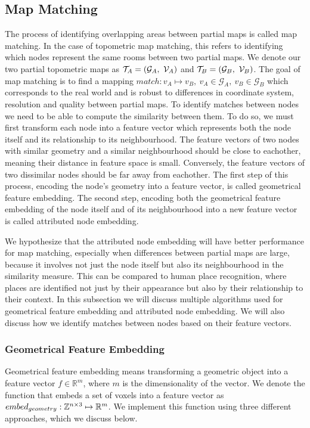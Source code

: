 \subsection{Map Matching}
The process of identifying overlapping areas between partial maps is called map matching. In the case of topometric map matching, this refers to identifying which nodes represent the same rooms between two partial maps. We denote our two partial topometric maps as \(\topometricmap_A = (\mathcal{G}_A,\ \voxelgrid_A)\) and \(\mathcal{T}_B = (\mathcal{G}_B,\ \mathcal{V}_B)\). The goal of map matching is to find a mapping \(match: v_A \mapsto v_B,\ v_A \in \mathcal{G}_A,\ v_B \in \mathcal{G}_B\) which corresponds to the real world and is robust to differences in coordinate system, resolution and quality between partial maps. To identify matches between nodes we need to be able to compute the similarity between them. To do so, we must first transform each node into a feature vector which represents both the node itself and its relationship to its neighbourhood. The feature vectors of two nodes with similar geometry and a similar neighbourhood should be close to eachother, meaning their distance in feature space is small. Conversely, the feature vectors of two dissimilar nodes should be far away from eachother. The first step of this process, encoding the node's geometry into a feature vector, is called geometrical feature embedding. The second step, encoding both the geometrical feature embedding of the node itself and of its neighbourhood into a new feature vector is called attributed node embedding. 

We hypothesize that the attributed node embedding will have better performance for map matching, especially when differences between partial maps are large, because it involves not just the node itself but also its neighbourhood in the similarity measure. This can be compared to human place recognition, where places are identified not just by their appearance but also by their relationship to their context. In this subsection we will discuss multiple algorithms used for geometrical feature embedding and attributed node embedding. We will also discuss how we identify matches between nodes based on their feature vectors.

\subsubsection{Geometrical Feature Embedding}
Geometrical feature embedding means transforming a geometric object into a feature vector \(f \in \mathbb{R}^m\), where \(m\) is the dimensionality of the vector. We denote the function that embeds a set of voxels into a feature vector as \(embed_{geometry}: \mathbb{Z}^{n \times 3} \mapsto \mathbb{R}^m\). We implement this function using three different approaches, which we discuss below.

